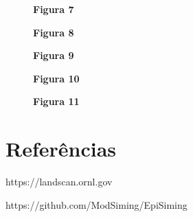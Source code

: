\documentclass[a4paper,12pt]{article}
\begin{document}
\begin{figure}[H]
	\begin{center}
		
	\end{center}
	\vspace{-0.4in}
	\caption*{\textbf{Figura 7}}
\end{figure}

\begin{figure}[H]
	\begin{center}
		
	\end{center}
	\vspace{-0.4in}
	\caption*{\textbf{Figura 8}}
\end{figure}

\begin{figure}[H]
	\begin{center}
		
	\end{center}
	\vspace{-0.4in}
	\caption*{\textbf{Figura 9}}
\end{figure}

\newpage
\begin{figure}[H]
	\begin{center}
		
	\end{center}
	\vspace{-0.4in}
	\caption*{\textbf{Figura 10}}
\end{figure}

\begin{figure}[H]
	\begin{center}
		
	\end{center}
	\vspace{-0.4in}
	\caption*{\textbf{Figura 11}}
\end{figure}


\section{Referências}

\begin{enumerate}[label={[\arabic*]}]
	\item https://landscan.ornl.gov
	\item https://github.com/ModSiming/EpiSiming
\end{enumerate}
\end{document}
